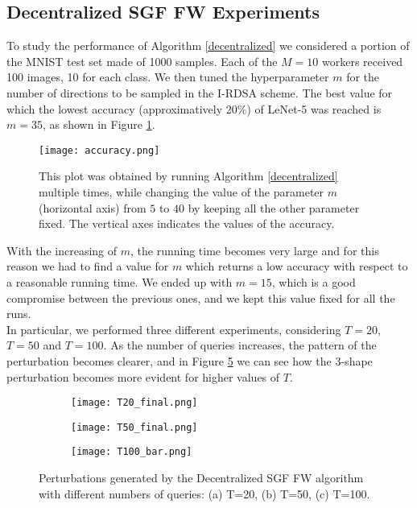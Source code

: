 \subsection{Decentralized SGF FW Experiments}
To study the performance of Algorithm \ref{decentralized} we considered a portion of the MNIST test set made of 1000 samples. Each of the $M=10$ workers received 100 images, 10 for each class.
We then tuned the hyperparameter $m$ for the number of directions to be sampled in the I-RDSA scheme. The best value for which the lowest accuracy (approximatively 20\%) of LeNet-5 was reached is $m=35$, as shown in Figure \ref{fig:accuracy}.\\
\begin{figure}[h]
	\centering
	\texttt{[image: accuracy.png]}
	\caption{{\small This plot was obtained by running Algorithm \ref{decentralized} multiple times, while changing the value of the parameter $m$ (horizontal axis) from $5$ to $40$ by keeping all the other parameter fixed. The vertical axes indicates the values of the accuracy.}}
	\label{fig:accuracy}
\end{figure}

With the increasing of $m$, the running time becomes very large and for this reason we had to find a value for $m$ which returns a low accuracy with respect to a reasonable running time. We ended up with $m=15$, which is a good compromise between the previous ones, and we kept this value fixed for all the runs.\\
\indent In particular, we performed three different experiments, considering $T=20$, $T=50$ and $T=100$. As the number of queries increases, the pattern of the perturbation becomes clearer, and in Figure \ref{fig:decentralized_perturbations} we can see how the 3-shape perturbation becomes more evident for higher values of $T$. 
\begin{figure}[h]
	\centering
	\begin{subfigure}[b]{0.15\textwidth}
		\centering
		\texttt{[image: T20\_final.png]}
		\caption{}
		\label{fig:decentralized_perturbation_20}
	\end{subfigure}
	\hfill
	\begin{subfigure}[b]{0.15\textwidth}
		\texttt{[image: T50\_final.png]}
		\caption{}
		\label{fig:decentralized_perturbation_50}
	\end{subfigure}
	\hfill
	\begin{subfigure}[b]{0.15\textwidth}
		\texttt{[image: T100\_bar.png]}
		\caption{}
		\label{fig:decentralized_perturbation_100}
	\end{subfigure}
	\caption{{\small Perturbations generated by the Decentralized SGF FW algorithm with different numbers of queries: (a) T=20, (b) T=50, (c) T=100.}}
	\label{fig:decentralized_perturbations}
\end{figure}

